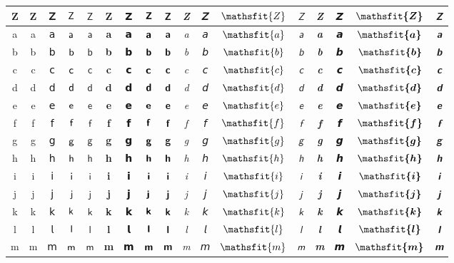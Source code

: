 \documentclass{standalone}
\newcommand{\SANS}[1]{\ifmmode\mathsf{#1}\else\textsf{#1}\fi}
\newcommand{\BSANS}[1]{\ifmmode\boldsymbol{\mathsf{#1}}\else\textbf{\textsf{#1}}\fi}
\newcommand{\ISANS}[1]{\ifmmode\mathsfit{#1}\else\textit{\textsf{#1}}\fi}
\newcommand{\BISANS}[1]{\ifmmode\bm{\mathsfit{#1}}\else\textbf{\textsf{\textit{#1}}}\fi}
\begin{document}
\begin{tabular}{c|cc|cc|cc|cc|cc|cc|cc|cc}
Z & \SANS{Z} & 𝖹 & $\SANS{Z}$ & $𝖹$ & \BSANS{Z} & 𝗭 & $\BSANS{Z}$ & $𝗭$ & \ISANS{Z} & 𝘡 & $\ISANS{Z}$ & $𝘡$ & \BISANS{Z} & 𝙕 & $\BISANS{Z}$ & $𝙕$  \\
\midrule
a & \SANS{a} & 𝖺 & $\SANS{a}$ & $𝖺$ & \BSANS{a} & 𝗮 & $\BSANS{a}$ & $𝗮$ & \ISANS{a} & 𝘢 & $\ISANS{a}$ & $𝘢$ & \BISANS{a} & 𝙖 & $\BISANS{a}$ & $𝙖$ \\
b & \SANS{b} & 𝖻 & $\SANS{b}$ & $𝖻$ & \BSANS{b} & 𝗯 & $\BSANS{b}$ & $𝗯$ & \ISANS{b} & 𝘣 & $\ISANS{b}$ & $𝘣$ & \BISANS{b} & 𝙗 & $\BISANS{b}$ & $𝙗$ \\
c & \SANS{c} & 𝖼 & $\SANS{c}$ & $𝖼$ & \BSANS{c} & 𝗰 & $\BSANS{c}$ & $𝗰$ & \ISANS{c} & 𝘤 & $\ISANS{c}$ & $𝘤$ & \BISANS{c} & 𝙘 & $\BISANS{c}$ & $𝙘$ \\
d & \SANS{d} & 𝖽 & $\SANS{d}$ & $𝖽$ & \BSANS{d} & 𝗱 & $\BSANS{d}$ & $𝗱$ & \ISANS{d} & 𝘥 & $\ISANS{d}$ & $𝘥$ & \BISANS{d} & 𝙙 & $\BISANS{d}$ & $𝙙$ \\
e & \SANS{e} & 𝖾 & $\SANS{e}$ & $𝖾$ & \BSANS{e} & 𝗲 & $\BSANS{e}$ & $𝗲$ & \ISANS{e} & 𝘦 & $\ISANS{e}$ & $𝘦$ & \BISANS{e} & 𝙚 & $\BISANS{e}$ & $𝙚$ \\
f & \SANS{f} & 𝖿 & $\SANS{f}$ & $𝖿$ & \BSANS{f} & 𝗳 & $\BSANS{f}$ & $𝗳$ & \ISANS{f} & 𝘧 & $\ISANS{f}$ & $𝘧$ & \BISANS{f} & 𝙛 & $\BISANS{f}$ & $𝙛$ \\
g & \SANS{g} & 𝗀 & $\SANS{g}$ & $𝗀$ & \BSANS{g} & 𝗴 & $\BSANS{g}$ & $𝗴$ & \ISANS{g} & 𝘨 & $\ISANS{g}$ & $𝘨$ & \BISANS{g} & 𝙜 & $\BISANS{g}$ & $𝙜$ \\
h & \SANS{h} & 𝗁 & $\SANS{h}$ & $𝗁$ & \BSANS{h} & 𝗵 & $\BSANS{h}$ & $𝗵$ & \ISANS{h} & 𝘩 & $\ISANS{h}$ & $𝘩$ & \BISANS{h} & 𝙝 & $\BISANS{h}$ & $𝙝$ \\
i & \SANS{i} & 𝗂 & $\SANS{i}$ & $𝗂$ & \BSANS{i} & 𝗶 & $\BSANS{i}$ & $𝗶$ & \ISANS{i} & 𝘪 & $\ISANS{i}$ & $𝘪$ & \BISANS{i} & 𝙞 & $\BISANS{i}$ & $𝙞$ \\
j & \SANS{j} & 𝗃 & $\SANS{j}$ & $𝗃$ & \BSANS{j} & 𝗷 & $\BSANS{j}$ & $𝗷$ & \ISANS{j} & 𝘫 & $\ISANS{j}$ & $𝘫$ & \BISANS{j} & 𝙟 & $\BISANS{j}$ & $𝙟$ \\
k & \SANS{k} & 𝗄 & $\SANS{k}$ & $𝗄$ & \BSANS{k} & 𝗸 & $\BSANS{k}$ & $𝗸$ & \ISANS{k} & 𝘬 & $\ISANS{k}$ & $𝘬$ & \BISANS{k} & 𝙠 & $\BISANS{k}$ & $𝙠$ \\
l & \SANS{l} & 𝗅 & $\SANS{l}$ & $𝗅$ & \BSANS{l} & 𝗹 & $\BSANS{l}$ & $𝗹$ & \ISANS{l} & 𝘭 & $\ISANS{l}$ & $𝘭$ & \BISANS{l} & 𝙡 & $\BISANS{l}$ & $𝙡$ \\
m & \SANS{m} & 𝗆 & $\SANS{m}$ & $𝗆$ & \BSANS{m} & 𝗺 & $\BSANS{m}$ & $𝗺$ & \ISANS{m} & 𝘮 & $\ISANS{m}$ & $𝘮$ & \BISANS{m} & 𝙢 & $\BISANS{m}$ & $𝙢$ \\

\end{tabular}
\end{document}
